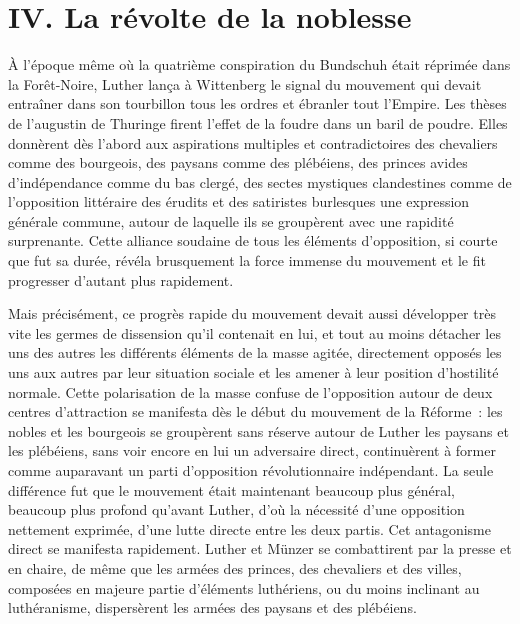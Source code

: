 \documentclass[french,twoside]{book} %
\newcommand\chapteropen{} %
\newcommand\chaptercont{} %
\begin{document}
\chapteropen
\chapter[{IV. La révolte de la noblesse}]{IV. La révolte de la noblesse}\renewcommand{\leftmark}{IV. La révolte de la noblesse}


\chaptercont
\noindent À l’époque même où la quatrième conspiration du Bundschuh était réprimée dans la Forêt-Noire, Luther lança à Wittenberg le signal du mouvement qui devait entraîner dans son tourbillon tous les ordres et ébranler tout l’Empire. Les thèses de l’augustin de Thuringe firent l’effet de la foudre dans un baril de poudre. Elles donnèrent dès l’abord aux aspirations multiples et contradictoires des chevaliers comme des bourgeois, des paysans comme des plébéiens, des princes avides d’indépendance comme du bas clergé, des sectes mystiques clandestines comme de l’opposition littéraire des érudits et des satiristes burlesques une expression générale commune, autour de laquelle ils se groupèrent avec une rapidité surprenante. Cette alliance soudaine de tous les éléments d’opposition, si courte que fut sa durée, révéla brusquement la force immense du mouvement et le fit progresser d’autant plus rapidement.\par
Mais précisément, ce progrès rapide du mouvement devait aussi développer très vite les germes de dissension qu’il contenait en lui, et tout au moins détacher les uns des autres les différents éléments de la masse agitée, directement opposés les uns aux autres par leur situation sociale et les amener à leur position d’hostilité normale. Cette polarisation de la masse confuse de l’opposition autour de deux centres d’attraction se manifesta dès le début du mouvement de la Réforme : les nobles et les bourgeois se groupèrent sans réserve autour de Luther les paysans et les plébéiens, sans voir encore en lui un adversaire direct, continuèrent à former comme auparavant un parti d’opposition révolutionnaire indépendant. La seule différence fut que le mouvement était maintenant beaucoup plus général, beaucoup plus profond qu’avant Luther, d’où la nécessité d’une opposition nettement exprimée, d’une lutte directe entre les deux partis. Cet antagonisme direct se manifesta rapidement. Luther et Münzer se combattirent par la presse et en chaire, de même que les armées des princes, des chevaliers et des villes, composées en majeure partie d’éléments luthériens, ou du moins inclinant au luthéranisme, dispersèrent les armées des paysans et des plébéiens.\par
\end{document}
